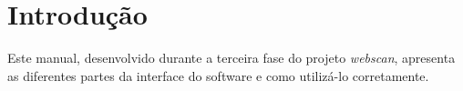 \section{Introdução}
\label{sec:intro}

Este manual, desenvolvido durante a terceira fase do projeto {\it webscan},
apresenta as diferentes partes da interface do software e como utilizá-lo
corretamente.
